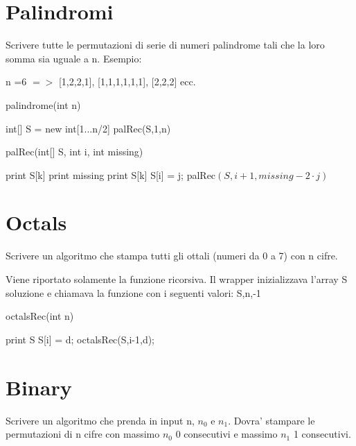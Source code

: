 \documentclass[oneside]{book}
\begin{document}
\section{Palindromi}
Scrivere tutte le permutazioni di serie di numeri palindrome tali che la loro somma sia uguale a n. Esempio:

n =6 $=>$ [1,2,2,1], [1,1,1,1,1,1], [2,2,2] ecc.

\begin{algorithm}

\caption{palindrome(int n)\label{cap:alg}}
\begin{algorithmic}
\State int[] S = new int[1...n/2]
\State palRec(S,1,n)
\end{algorithmic}
\end{algorithm}

\begin{algorithm}

\caption{palRec(int[] S, int i, int missing)\label{cap:alg}}
\begin{algorithmic}
	\State print S[k]
\EndFor	
{}
	\State print missing
\EndIf
{}
	\State print S[k]
\EndFor
{}
	\State S[i] = j;
	palRec$(S,i+1,missing-2\cdot j)$
\EndFor
\end{algorithmic}
\end{algorithm}

\newpage
\section{Octals}
Scrivere un algoritmo che stampa tutti gli ottali (numeri da 0 a 7) con n cifre.

Viene riportato solamente la funzione ricorsiva. Il wrapper inizializzava l'array S soluzione e chiamava la funzione con i seguenti valori: S,n,-1

\begin{algorithm}
\caption{octalsRec(int n)\label{alg:cap}}
\begin{algorithmic}
	\State print S
\Else
			\State S[i] = d;
			\State octalsRec(S,i-1,d);
		\EndIf
	\EndFor
\EndIf

\end{algorithmic}
\end{algorithm}

\newpage
\section{Binary}
Scrivere un algoritmo che prenda in input n, $n_0$ e $n_1$. Dovra' stampare le permutazioni di n cifre con massimo $n_0$ 0 consecutivi e massimo $n_1$ 1 consecutivi. 
\end{document}
